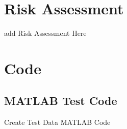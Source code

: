 
\chapter{Risk Assessment}

add Risk Assessment Here













\chapter{Code}


\section{MATLAB Test Code}

\lstset{style=Matlab-editor,basicstyle=\mlttfamily\small\singlespacing,title=\lstname}

\begin{listing}[H]
\protect\caption{Create Test Data MATLAB Code\label{lst:createTestData}}



\end{listing}


